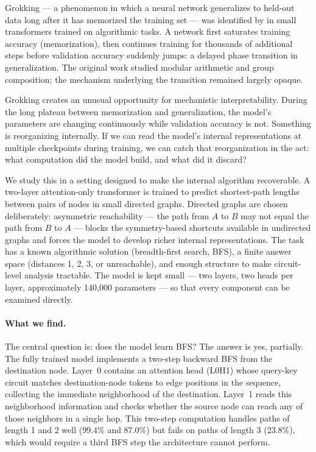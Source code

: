 \documentclass[11pt, a4paper]{article}
\begin{document}
Grokking --- a phenomenon in which a neural network generalizes to
held-out data long after it has memorized the training set --- was
identified by \citet{power2022grokking} in small transformers trained
on algorithmic tasks.  A network first saturates training accuracy
(memorization), then continues training for thousands of additional
steps before validation accuracy suddenly jumps: a delayed phase
transition in generalization.  The original work studied modular
arithmetic and group composition; the mechanism underlying the
transition remained largely opaque.

Grokking creates an unusual opportunity for mechanistic interpretability.
During the long plateau between memorization and generalization, the
model's parameters are changing continuously while validation accuracy
is not.  Something is reorganizing internally.  If we can read the
model's internal representations at multiple checkpoints during
training, we can catch that reorganization in the act: what computation
did the model build, and what did it discard?

We study this in a setting designed to make the internal algorithm
recoverable.  A two-layer attention-only transformer is trained to
predict shortest-path lengths between pairs of nodes in small directed
graphs.  Directed graphs are chosen deliberately: asymmetric
reachability --- the path from $A$ to $B$ may not equal the path from
$B$ to $A$ --- blocks the symmetry-based shortcuts available in
undirected graphs and forces the model to develop richer internal
representations.  The task has a known algorithmic solution
(breadth-first search, BFS), a finite answer space (distances 1, 2, 3,
or unreachable), and enough structure to make circuit-level analysis
tractable.  The model is kept small --- two layers, two heads per
layer, approximately 140{,}000 parameters --- so that every component
can be examined directly.

\paragraph{What we find.}
The central question is: does the model learn BFS?  The answer is yes,
partially.  The fully trained model implements a two-step backward BFS
from the destination node.  Layer~0 contains an attention head (L0H1)
whose query-key circuit matches destination-node tokens to edge
positions in the sequence, collecting the immediate neighborhood of the
destination.  Layer~1 reads this neighborhood information and checks
whether the source node can reach any of those neighbors in a single
hop.  This two-step computation handles paths of length 1 and 2 well
(99.4\% and 87.0\%) but fails on paths of length 3 (23.8\%), which
would require a third BFS step the architecture cannot perform.
\end{document}
